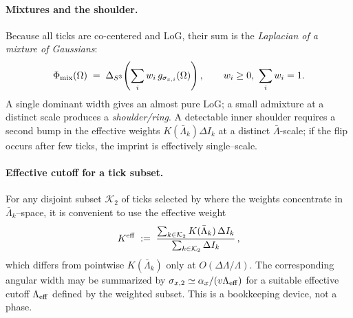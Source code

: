\documentclass[10pt]{article}
\theoremstyle{definition}
\theoremstyle{plain}
\begin{document}
\paragraph{Mixtures and the shoulder.}\label{par:uom-main-161}
Because all ticks are co-centered and LoG, their sum is the \emph{Laplacian of a mixture of Gaussians}:
\[
\Phi_{\rm mix}(\Omega)\;=\;\Delta_{S^3}\!\left(\sum_{i} w_i\,g_{\sigma_{x,i}}(\Omega)\right),
\qquad w_i\ge 0,\ \sum_i w_i=1.
\]
A single dominant width gives an almost pure LoG; a small admixture at a distinct scale produces a
\emph{shoulder/ring}. A detectable inner shoulder requires a second bump in the effective weights
$K(\bar\Lambda_k)\Delta I_k$ at a distinct \(\bar\Lambda\)-scale; if the flip occurs after few ticks,
the imprint is effectively single--scale.

\paragraph{Effective cutoff for a tick subset.}\label{par:uom-main-162}
For any disjoint subset $\mathcal K_2$ of ticks selected by where the weights concentrate in
$\bar\Lambda_k$--space, it is convenient to use the effective weight
\[
K^{\rm eff}\;:=\;\frac{\sum_{k\in\mathcal K_2} K(\bar\Lambda_k)\,\Delta I_k}{\sum_{k\in\mathcal K_2}\Delta I_k}\,,
\]
which differs from pointwise $K(\bar\Lambda_k)$ only at $O(\Delta\Lambda/\Lambda)$. The corresponding angular width
may be summarized by $\sigma_{x,2}\simeq \alpha_x/(v\Lambda_{\rm eff})$ for a suitable effective cutoff
$\Lambda_{\rm eff}$ defined by the weighted subset. This is a bookkeeping device, not a phase.
\end{document}
